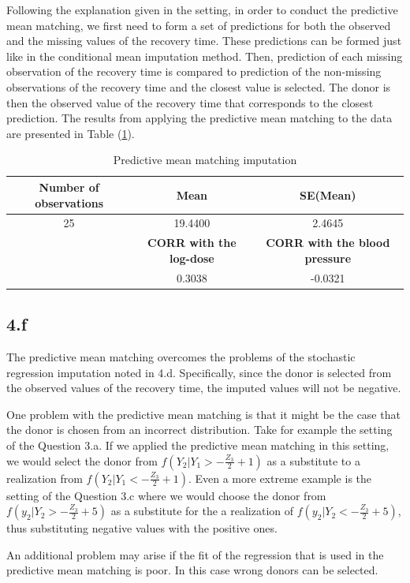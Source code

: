 \documentclass{article}
\begin{document}
Following the explanation given in the setting, in order to conduct the predictive mean matching, we first need to form a set of predictions for both the observed and the missing values of the recovery time. These predictions can be formed just like in the conditional mean imputation method. Then, prediction of each missing observation of the recovery time is compared to prediction of the non-missing observations of the recovery time and the closest value is selected. The donor is then the observed value of the recovery time that corresponds to the closest prediction.  The results from applying the predictive mean matching to the data are presented in Table (\ref{Tab_5}).


\begin{table}[H]
\caption{Predictive mean matching imputation}
\label{Tab_5}
\begin{tabular}{|c |c| c|}

\hline
\hline
 \textbf{Number of observations} & \textbf{Mean} &\textbf{SE(Mean)} \\[2ex]
\hline
25 &19.4400 &2.4645 \\
\hline
 &\textbf{CORR with the log-dose} &\textbf{CORR with the blood pressure} \\[2ex] 
\hline
 &0.3038 &-0.0321 \\
\hline
\hline

\end{tabular}
\end{table}

\subsection*{4.f}

The predictive mean matching overcomes the problems of the stochastic regression imputation noted in 4.d. Specifically, since the donor is selected from the observed values of the recovery time, the imputed values will not be negative. 

One problem with the predictive mean matching is that it might be the case that the donor is chosen from an incorrect distribution. Take for example the setting of the Question 3.a. If we applied the predictive mean matching in this setting, we would select the donor from $f(Y_{2}|Y_{1}>-\frac{Z_{3}}{2}+1)$ as a substitute to a realization from  $f(Y_{2}|Y_{1}<-\frac{Z_{3}}{2}+1)$. Even a more extreme example is the setting of the Question 3.c where we would choose the donor from $f(y_{2}|Y_{2}>-\frac{Z_{3}}{2}+5)$  as a substitute for the a realization of  $f(y_{2}|Y_{2}<-\frac{Z_{3}}{2}+5)$, thus substituting negative values with the positive ones. 

An additional problem may arise if the fit of the regression that is used in the predictive mean matching is poor. In this case wrong donors can be selected. 
\end{document}
